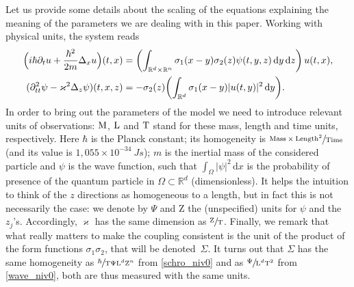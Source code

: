 \documentclass[10pt]{amsart}
\theoremstyle{definition}
\newcommand{\ud}{\, {\mathrm{d}}}
\begin{document}
Let us provide some details about the scaling of the equations
explaining the meaning of the parameters we are dealing with in this paper. Working with physical units, the system reads
\begin{subequations}
\begin{align}
\label{schro_niv0}
\Bigl(i\hbar \partial_{t}u+\frac{\hbar ^2}{2m}\Delta_{x}u\Bigr)(t,x)&=\left(\int_{\mathbb R^d\times\mathbb R^n}
\sigma_{1}(x-y) \sigma_{2}(z)\psi(t,y,z)\ud y\ud z\right)u(t,x),\\
\label{wave_niv0}(\partial_{tt}^{2}\psi-\varkappa^{2}\Delta_{z}\psi)(t,x,z)&=-\sigma_{2}(z)\biggl(\int_{\mathbb R^d} \sigma_{1}(x-y)|u(t,y)|^{2}
\ud y\biggr).
\end{align}
\end{subequations}
In order to bring out the parameters of the model we need to introduce relevant units of observations: $\textup M$, $\textup L$ and $\textup T$
stand for these mass, length and time units, respectively.
Here $\hbar $ is the Planck constant; its homogeneity is $\sfrac{\textup{Mass}\times \textup{Length}^2}{ \textup{Time}}$ (and its value is $1,055 \times10^{-34}\ J s$); $m$ is the inertial mass of the considered particle and $\psi$ is the wave function, such that $\int_\Omega |\psi|^2\ud x$ is
the probability of presence of the quantum particle in $\Omega\subset \mathbb R^d$ (dimensionless).
It helps the intuition to think of the $z$ directions as homogeneous to a length, but in fact this is not necessarily the case: we denote by $\Psi$ and $\mathrm Z$ the (unspecified) units for $\psi$ and the $z_j$'s. Accordingly, $\varkappa$ has the same dimension as $\sfrac{\mathrm Z}{\mathrm T}$.
Finally, we remark that what really matters to make the coupling consistent is the unit of the product of the form functions $\sigma_1\sigma_2$, that will be denoted~$\Sigma$. It turns out that $\Sigma $ has the same homogeneity
as
$\sfrac{\hbar }{ \mathrm T \Psi\mathrm L^d\mathrm Z^n}$
from \eqref{schro_niv0}
and
as $\sfrac{ \Psi}{\mathrm L^d \mathrm T^2}$
from \eqref{wave_niv0}, both are thus measured with the same units.
\end{document}
